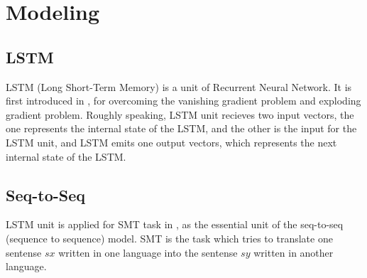 \documentclass[senior,final,11pt]{iscs-thesis}
\newcommand{\argmax}{\mathop{\rm arg\,max}\limits}
\begin{document}


\section{Modeling}

\subsection{LSTM}
LSTM (Long Short-Term Memory) is a unit of Recurrent Neural Network. 
It is first introduced in \cite{first_LSTM}, for overcoming the vanishing gradient problem and exploding gradient problem.
Roughly speaking, LSTM unit recieves two input vectors, 
the one represents the internal state of the LSTM, and the other is the input for the LSTM unit, 
and LSTM emits one output vectors, which represents the next internal state of the LSTM.

\subsection{Seq-to-Seq}

LSTM unit is applied for SMT task in \cite{seq2seq}, as the essential unit of the seq-to-seq (sequence to sequence) model.
SMT is the task which tries to translate one sentense $sx$ written in one language into the sentense $sy$ written in another language.
\end{document}
